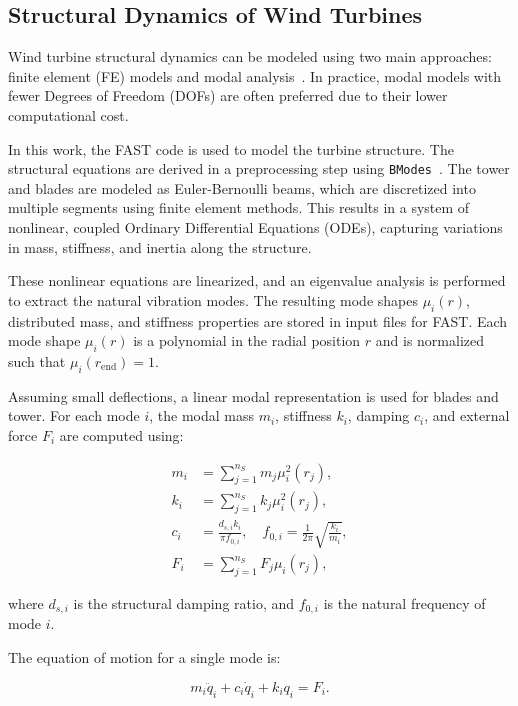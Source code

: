 \subsection{Structural Dynamics of Wind Turbines}

Wind turbine structural dynamics can be modeled using two main approaches: finite element (FE) models and modal analysis~\cite{bossanyi2010}. In practice, modal models with fewer Degrees of Freedom (DOFs) are often preferred due to their lower computational cost.

In this work, the FAST code is used to model the turbine structure. The structural equations are derived in a preprocessing step using \texttt{BModes}~\cite{bir2009}. The tower and blades are modeled as Euler-Bernoulli beams, which are discretized into multiple segments using finite element methods. This results in a system of nonlinear, coupled Ordinary Differential Equations (ODEs), capturing variations in mass, stiffness, and inertia along the structure.

These nonlinear equations are linearized, and an eigenvalue analysis is performed to extract the natural vibration modes. The resulting mode shapes $\mu_i(r)$, distributed mass, and stiffness properties are stored in input files for FAST. Each mode shape $\mu_i(r)$ is a polynomial in the radial position $r$ and is normalized such that $\mu_i(r_{\text{end}}) = 1$.

Assuming small deflections, a linear modal representation is used for blades and tower. For each mode $i$, the modal mass $m_i$, stiffness $k_i$, damping $c_i$, and external force $F_i$ are computed using:

\begin{align}
    m_i &= \sum_{j=1}^{n_S} m_j \mu_i^2(r_j), \label{eq:modal_mass} \\
    k_i &= \sum_{j=1}^{n_S} k_j \mu_i^2(r_j), \label{eq:modal_stiffness} \\
    c_i &= \frac{d_{s,i} k_i}{\pi f_{0,i}}, \quad f_{0,i} = \frac{1}{2\pi} \sqrt{\frac{k_i}{m_i}}, \label{eq:modal_damping} \\
    F_i &= \sum_{j=1}^{n_S} F_j \mu_i(r_j), \label{eq:modal_force}
\end{align}

where $d_{s,i}$ is the structural damping ratio, and $f_{0,i}$ is the natural frequency of mode $i$.

The equation of motion for a single mode is:

\begin{equation}
    m_i \ddot{q}_i + c_i \dot{q}_i + k_i q_i = F_i. \label{eq:single_mode_eom}
\end{equation}

